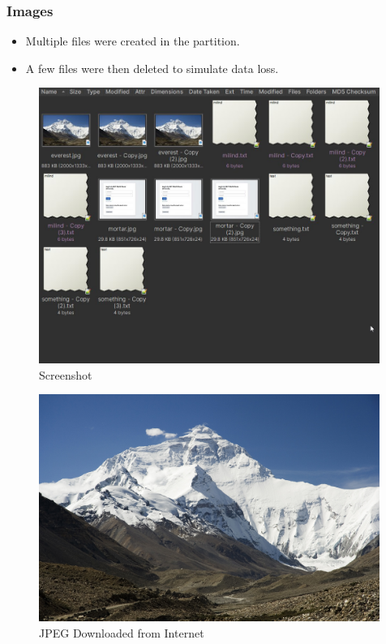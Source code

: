 \documentclass[11pt]{article}
\begin{document}
\subsubsection{Images}
\begin{itemize}
    \item Multiple files were created in the partition.
    \item A few files were then deleted to simulate data loss.
\end{itemize}
\begin{figure}[H]
    \centering
    \includegraphics[width=0.99\textwidth]{folder.jpg}
    \caption{Screenshot}
    \label{fig:1}
\end{figure}
\begin{figure}[H]
    \centering
    \includegraphics[width=0.99\textwidth]{everest.jpg}
    \caption{JPEG Downloaded from Internet}
    \label{fig:1}
\end{figure}
\end{document}
